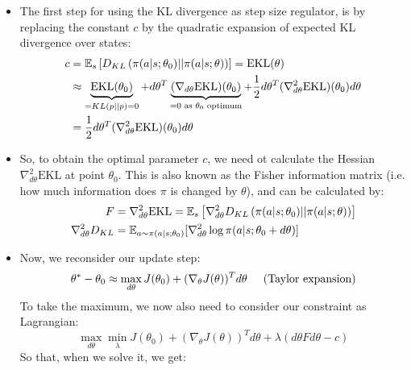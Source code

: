 \begin{itemize}
	\item The first step for using the KL divergence as step size regulator, is by replacing the constant $c$ by the quadratic expansion of expected KL divergence over states:
	\begin{equation*}
		\begin{split}
			c & = \mathbb{E}_{s}\left[D_{KL}\left(\pi(a|s;\theta_0)||\pi(a|s;\theta)\right)\right] = \text{EKL}(\theta)\\
			& \approx \underbrace{\text{EKL}(\theta_0)}_{=KL(p||p)=0} + d\theta^T \underbrace{(\nabla_{d\theta}\text{EKL})(\theta_0)}_{=0 \text{ as }\theta_0\text{ optimum}} + \frac{1}{2}d\theta^T (\nabla_{d\theta}^2\text{EKL})(\theta_0)d\theta\\
			& = \frac{1}{2}d\theta^T (\nabla_{d\theta}^2\text{EKL})(\theta_0)d\theta\\
		\end{split}
	\end{equation*}
	\item So, to obtain the optimal parameter $c$, we need ot calculate the Hessian $\nabla_{d\theta}^2\text{EKL}$ at point $\theta_0$. This is also known as the Fisher information matrix (i.e. how much information does $\pi$ is changed by $\theta$), and can be calculated by:
	\begin{equation*}
		\begin{split}
			F & = \nabla_{d\theta}^2\text{EKL} = \mathbb{E}_{s}\left[\nabla_{d\theta}^2 D_{KL}\left(\pi(a|s;\theta_0)||\pi(a|s;\theta)\right)\right]\\
			\nabla_{d\theta}^2 D_{KL} & = \mathbb{E}_{a\sim\pi(a|s;\theta_0)}[\nabla_{d\theta}^2 \log \pi(a|s;\theta_0+d\theta)]
		\end{split}
	\end{equation*}
	\item Now, we reconsider our update step:
	\begin{equation*}
		\begin{split}
			\theta^{*}-\theta_0 & \approx \max_{d\theta} J(\theta_0) + (\nabla_{\theta} J(\theta))^T d\theta \hspace{5mm}\text{(Taylor expansion)}\\
		\end{split}
	\end{equation*}
	To take the maximum, we now also need to consider our constraint as Lagrangian:
	$$\max_{d\theta}\min_{\lambda} J(\theta_0) + (\nabla_{\theta} J(\theta))^T d\theta + \lambda (d\theta F d\theta-c)$$
	So that, when we solve it, we get:

\end{itemize}
